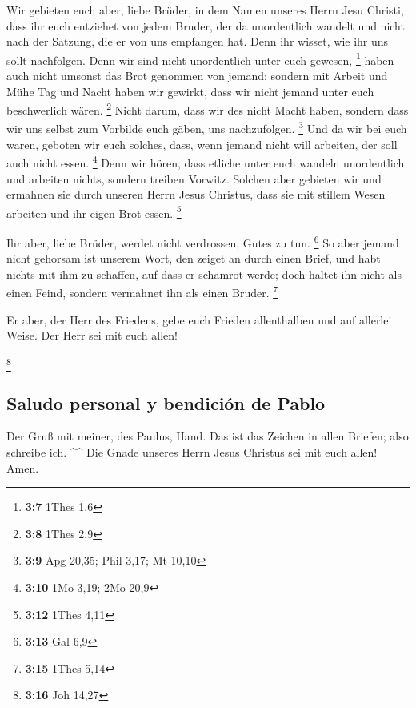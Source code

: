  Wir gebieten euch aber, liebe Brüder, in dem Namen
unseres Herrn Jesu Christi, dass ihr euch entziehet von jedem Bruder,
der da unordentlich wandelt und nicht nach der Satzung, die er von uns
empfangen hat.  Denn ihr wisset, wie ihr uns sollt
nachfolgen. Denn wir sind nicht unordentlich unter euch gewesen,
\footnote{\textbf{3:7} 1Thes 1,6}  haben auch nicht
umsonst das Brot genommen von jemand; sondern mit Arbeit und Mühe Tag
und Nacht haben wir gewirkt, dass wir nicht jemand unter euch
beschwerlich wären. \footnote{\textbf{3:8} 1Thes 2,9} 
Nicht darum, dass wir des nicht Macht haben, sondern dass wir uns selbst
zum Vorbilde euch gäben, uns nachzufolgen. \footnote{\textbf{3:9} Apg
  20,35; Phil 3,17; Mt 10,10}  Und da wir bei euch waren,
geboten wir euch solches, dass, wenn jemand nicht will arbeiten, der
soll auch nicht essen. \footnote{\textbf{3:10} 1Mo 3,19; 2Mo 20,9}
 Denn wir hören, dass etliche unter euch wandeln
unordentlich und arbeiten nichts, sondern treiben Vorwitz.
 Solchen aber gebieten wir und ermahnen sie durch unseren
Herrn Jesus Christus, dass sie mit stillem Wesen arbeiten und ihr eigen
Brot essen. \footnote{\textbf{3:12} 1Thes 4,11}

 Ihr aber, liebe Brüder, werdet nicht verdrossen, Gutes
zu tun. \footnote{\textbf{3:13} Gal 6,9}  So aber jemand
nicht gehorsam ist unserem Wort, den zeiget an durch einen Brief, und
habt nichts mit ihm zu schaffen, auf dass er schamrot werde;
 doch haltet ihn nicht als einen Feind, sondern vermahnet
ihn als einen Bruder. \footnote{\textbf{3:15} 1Thes 5,14}

 Er aber, der Herr des Friedens, gebe euch Frieden
allenthalben und auf allerlei Weise. Der Herr sei mit euch allen!

\footnote{\textbf{3:16} Joh 14,27}

\hypertarget{saludo-personal-y-bendiciuxf3n-de-pablo}{%
\subsection{Saludo personal y bendición de
Pablo}\label{saludo-personal-y-bendiciuxf3n-de-pablo}}

 Der Gruß mit meiner, des Paulus, Hand. Das ist das
Zeichen in allen Briefen; also schreibe ich. \^{}\^{} 
Die Gnade unseres Herrn Jesus Christus sei mit euch allen! Amen.
